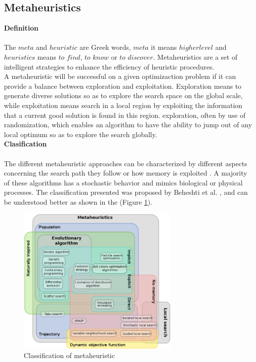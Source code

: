 \subsection{Metaheuristics}
\textbf{Definition}
~\\
~\\
The $meta$ and $heuristic$ are Greek words, $meta$ it means $higher level$ and $heuristics$ means $to$ $find$, $to$ $know$ or $to$ $discover$. Metaheuristics are a set of intelligent strategies to enhance the efficiency of heuristic procedures.\\
A metaheuristic will be successful on a given optimizaction problem if it can provide a balance between exploration and exploitation. Exploration means to generate diverse solutions so as to explore the search space on the global scale, while exploitation means search in a local region by exploiting the information that a current good solution is found in this region.
exploration, often by use of randomization, which enables an algorithm to have the ability to jump out of any local optimum so as to explore the search globally.\\

\textbf{Clasification}
~\\
~\\
The different metaheuristic approaches can be characterized by different aspects concerning the search path they follow or how memory is exploited \cite{citeulike:1859945}. A majority of these algorithms has a stochastic behavior and mimics biological or  physical processes. The classification presented was proposed by Beheshti et al. \cite{Beheshti:2014:CCA:2563733.2564085}, and can be understood better as shown in the (Figure \ref{fig:classification-of-mh}).

\squeezeup
\begin{figure}[ht]
	\centering
  \includegraphics[width=0.70\textwidth]{MarcoTeorico/imagenes/classification_mh.png}
	\caption{Classification of metaheuristic}\label{fig:classification-of-mh}
\end{figure}
\squeezeup


